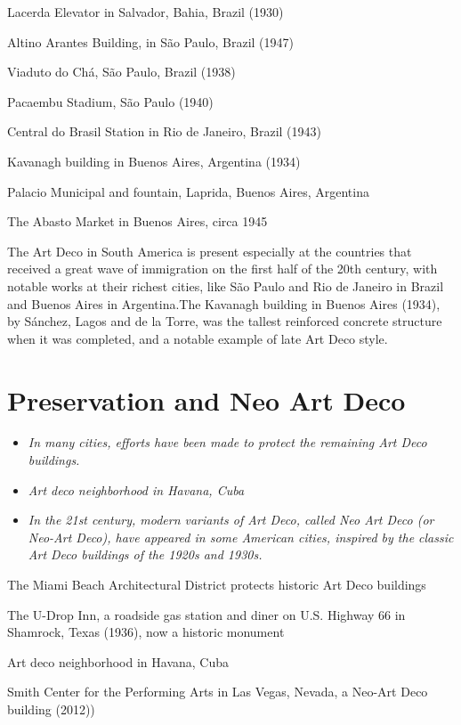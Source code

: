 Lacerda Elevator in Salvador, Bahia, Brazil (1930)

Altino Arantes Building, in São Paulo, Brazil (1947)

Viaduto do Chá, São Paulo, Brazil (1938)

Pacaembu Stadium, São Paulo (1940)

Central do Brasil Station in Rio de Janeiro, Brazil (1943)

Kavanagh building in Buenos Aires, Argentina (1934)

Palacio Municipal and fountain, Laprida, Buenos Aires, Argentina

The Abasto Market in Buenos Aires, circa 1945

The Art Deco in South America is present especially at the countries
that received a great wave of immigration on the first half of the 20th
century, with notable works at their richest cities, like São Paulo and
Rio de Janeiro in Brazil and Buenos Aires in Argentina.The Kavanagh
building in Buenos Aires (1934), by Sánchez, Lagos and de la Torre, was
the tallest reinforced concrete structure when it was completed, and a
notable example of late Art Deco style.

\section{Preservation and Neo Art
Deco}\label{preservation-and-neo-art-deco}

\begin{itemize}
\item
  \emph{In many cities, efforts have been made to protect the remaining
  Art Deco buildings.}
\item
  \emph{Art deco neighborhood in Havana, Cuba}
\item
  \emph{In the 21st century, modern variants of Art Deco, called Neo Art
  Deco (or Neo-Art Deco), have appeared in some American cities,
  inspired by the classic Art Deco buildings of the 1920s and 1930s.}
\end{itemize}

The Miami Beach Architectural District protects historic Art Deco
buildings

The U-Drop Inn, a roadside gas station and diner on U.S. Highway 66 in
Shamrock, Texas (1936), now a historic monument

Art deco neighborhood in Havana, Cuba

Smith Center for the Performing Arts in Las Vegas, Nevada, a Neo-Art
Deco building (2012))

